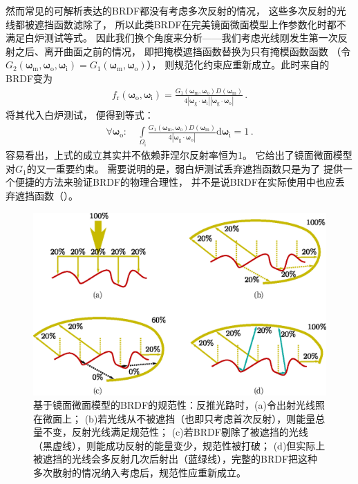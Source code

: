 然而常见的可解析表达的BRDF都没有考虑多次反射的情况，
这些多次反射的光线都被遮挡函数滤除了，
所以此类BRDF在完美镜面微面模型上作参数化时都不满足白炉测试等式。
因此我们换个角度来分析——我们考虑光线刚发生第一次反射之后、离开曲面之前的情况，
即把掩模遮挡函数替换为只有掩模函数函数
（令$G_2({\bm\omega}_{\mathrm{m}},{\bm\omega}_{\mathrm{o}},{\bm\omega}_{\mathrm{i}})
    =G_1({\bm\omega}_{\mathrm{m}},{\bm\omega}_{\mathrm{o}})$），
则规范化约束应重新成立。此时来自的BRDF变为
\begin{align}
    f_{\mathrm{r}}({\bm\omega}_{\mathrm{o}},{\bm\omega}_{\mathrm{i}})
    =\frac{G_1({\bm\omega}_{\mathrm{m}},{\bm\omega}_{\mathrm{o}})D({\bm\omega}_{\mathrm{m}})}
    {4|{\bm\omega}_{\mathrm{g}}\cdot{\bm\omega}_{\mathrm{i}}||{\bm\omega}_{\mathrm{g}}\cdot{\bm\omega}_{\mathrm{o}}|}\, .
\end{align}
将其代入白炉测试，
便得到等式：
\begin{align}\label{eq:08ex01-WeakWhiteFurnaceTest}
    \forall {\bm\omega}_{\mathrm{o}}: \quad\int\limits_{{\varOmega}_{\mathrm{i}}}
    \frac{G_1({\bm\omega}_{\mathrm{m}},{\bm\omega}_{\mathrm{o}})D({\bm\omega}_{\mathrm{m}})}
    {4|{\bm\omega}_{\mathrm{g}}\cdot{\bm\omega}_{\mathrm{o}}|}\mathrm{d}{\bm\omega}_{\mathrm{i}}=1\, .
\end{align}
容易看出，上式的成立其实并不依赖菲涅尔反射率恒为1。
它给出了镜面微面模型对$G_1$的又一重要约束。
需要说明的是，弱白炉测试丢弃遮挡函数只是为了
提供一个便捷的方法来验证BRDF的物理合理性，
并不是说BRDF在实际使用中也应丢弃遮挡函数（）。
\begin{figure}[htbp]
    \centering
    \includegraphics[width=\linewidth]{Pictures/chap08/CompleteWhiteFurnaceTest.eps}
    \caption{基于镜面微面模型的BRDF的规范性：反推光路时，(a)令出射光线照在微面上；
    (b)若光线从不被遮挡（也即只考虑首次反射），则能量总量不变，反射光线满足规范性；
    (c)若BRDF剔除了被遮挡的光线（黑虚线），则能成功反射的能量变少，规范性被打破；
    (d)但实际上被遮挡的光线会多反射几次后射出（蓝绿线），完整的BRDF把这种多次散射的情况纳入考虑后，规范性应重新成立。}
    \label{fig:08ex01-CompleteWhiteFurnaceTest}
\end{figure}

